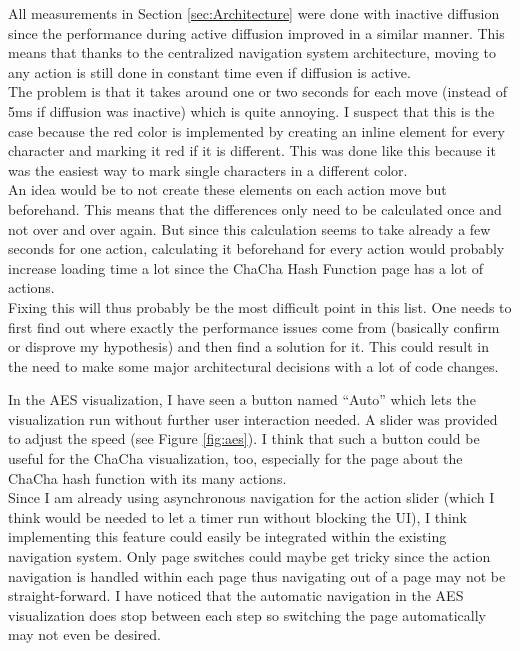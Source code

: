 \begin{description}[style=nextline]
All measurements in Section \ref{sec:Architecture} were done with inactive diffusion since the performance during active diffusion improved in a similar manner. This means that thanks to the centralized navigation system architecture, moving to any action is still done in constant time even if diffusion is active. \\
The problem is that it takes around one or two seconds for each move (instead of 5ms if diffusion was inactive) which is quite annoying. I suspect that this is the case because the red color is implemented by creating an inline element for every character and marking it red if it is different. This was done like this because it was the easiest way to mark single characters in a different color. \\
An idea would be to not create these elements on each action move but beforehand. This means that the differences only need to be calculated once and not over and over again. But since this calculation seems to take already a few seconds for one action, calculating it beforehand for every action would probably increase loading time a lot since the ChaCha Hash Function page has a lot of actions. \\
Fixing this will thus probably be the most difficult point in this list. One needs to first find out where exactly the performance issues come from (basically confirm or disprove my hypothesis) and then find a solution for it. This could result in the need to make some major architectural decisions with a lot of code changes.

\item[Automatic navigation]

In the AES visualization, I have seen a button named ``Auto'' which lets the visualization run without further user interaction needed. A slider was provided to adjust the speed (see Figure \ref{fig:aes}). I think that such a button could be useful for the ChaCha visualization, too, especially for the page about the ChaCha hash function with its many actions. \\
Since I am already using asynchronous navigation for the action slider (which I think would be needed to let a timer run without blocking the UI), I think implementing this feature could easily be integrated within the existing navigation system. Only page switches could maybe get tricky since the action navigation is handled within each page thus navigating out of a page may not be straight-forward. I have noticed that the automatic navigation in the AES visualization does stop between each step so switching the page automatically may not even be desired.


\end{description}

